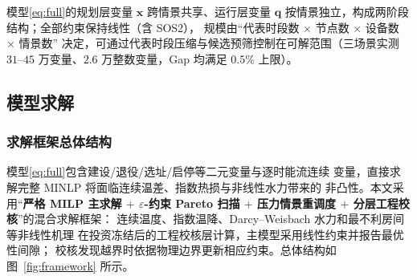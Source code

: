 模型\eqref{eq:full}的规划层变量 $\bm{x}$ 跨情景共享、运行层变量
$\bm{q}$ 按情景独立，构成两阶段结构；全部约束保持线性（含 SOS2），
规模由“代表时段数 $\times$ 节点数 $\times$ 设备数 $\times$ 情景数”
决定，可通过代表时段压缩与候选预筛控制在可解范围（三场景实测
$31$--$45$ 万变量、$2.6$ 万整数变量，Gap 均满足 $0.5\%$ 上限）。

\subsection{模型求解}

\subsubsection{求解框架总体结构}

模型\eqref{eq:full}包含建设/退役/选址/启停等二元变量与逐时能流连续
变量，直接求解完整 MINLP 将面临连续温差、指数热损与非线性水力带来的
非凸性。本文采用“\textbf{严格 MILP 主求解 $+$ $\varepsilon$-约束
Pareto 扫描 $+$ 压力情景重调度 $+$ 分层工程校核}”的混合求解框架：
连续温度、指数温降、Darcy--Weisbach 水力和最不利房间等非线性机理
在投资冻结后的工程校核层计算，主模型采用线性约束并报告最优性间隙；
校核发现越界时依据物理边界更新相应约束。总体结构如
图~\ref{fig:framework} 所示。

